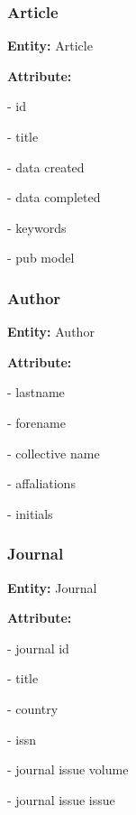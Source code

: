 \documentclass{article}
\begin{document}
\subsubsection{Article}
\setlist 
\begin{mylist}  
 \item \textbf{Entity:} Article
 \item \textbf{Attribute:}
  \item - id  
  \item - title  
  \item - data created
  \item - data completed
  \item - keywords
  \item - pub model
\end{mylist} 

\subsubsection{Author}
\setlist 
\begin{mylist}  
 \item \textbf{Entity:} Author
 \item \textbf{Attribute:}
  \item - lastname  
  \item - forename  
  \item - collective name 
  \item - affaliations 
  \item - initials  
\end{mylist}  


\subsubsection{Journal}
\setlist 
\begin{mylist}  
 \item \textbf{Entity:} Journal
 \item \textbf{Attribute:}
  \item - journal id  
  \item - title  
  \item - country
  \item - issn
  \item - journal issue volume
  \item - journal issue issue
  
\end{mylist}  
\end{document}
